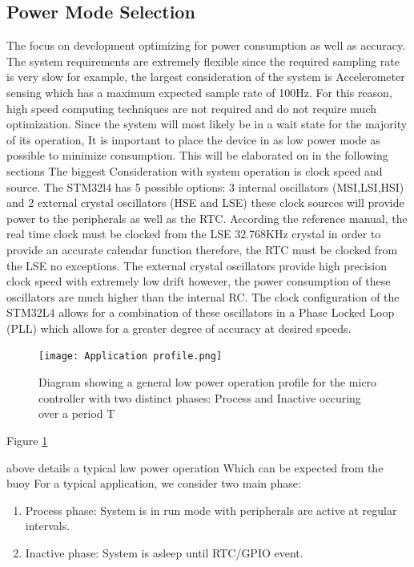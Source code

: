 \subsection{Power Mode Selection}

The focus on development optimizing for power consumption as well as accuracy. The system requirements are extremely flexible since the required sampling rate is very slow for example, the largest consideration of the system is Accelerometer sensing which has a maximum expected sample rate of 100Hz. For this reason, high speed computing techniques are not required and do not require much optimization. Since the system will most likely be in a wait state for the majority of its operation, It is important to place the device in as low power mode as possible to minimize consumption. This will be elaborated on in the following sections
The biggest Consideration with system operation is clock speed and source. The STM32l4 has 5 possible options: 3 internal oscillators (MSI,LSI,HSI) and 2 external crystal oscillators (HSE and LSE) these clock sources will provide power to the peripherals as well as the RTC. According the reference manual, the real time clock must be clocked from the LSE 32.768KHz crystal in order to provide an accurate calendar function therefore, the RTC must be clocked from the LSE no exceptions. The external crystal oscillators provide high precision clock speed with extremely low drift however, the power consumption of these oscillators are much higher than the internal RC. The clock configuration of the STM32L4 allows for a combination of these oscillators in a Phase Locked Loop (PLL) which allows for a greater degree of accuracy at desired speeds. 

\begin{figure}[H]
	\centering
	\texttt{[image: Application profile.png]}
	\caption{Diagram showing a general low power operation profile  for the micro controller with two distinct phases: Process and Inactive occuring over a period T}
	\label{fig:appr}
\end{figure}

Figure \ref{fig:appr}

above details a typical low power operation Which can be expected from the buoy For a typical application, we consider two main phase:
\begin{enumerate}
	\item Process phase: System is in run mode with peripherals are active at regular intervals.
	\item Inactive phase: System is asleep until RTC/GPIO event.
\end{enumerate}

